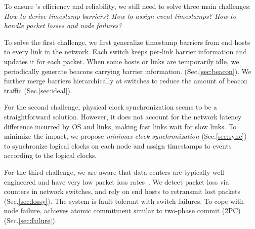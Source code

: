 To ensure \sys's efficiency and reliability, we still need to solve three main challenges: \textit{How to derive timestamp barriers? How to assign event timestamps? How to handle packet losses and node failures?}

To solve the first challenge, we first generalize timestamp barriers from end hosts to every link in the network. Each switch keeps per-link barrier information and updates it for each packet. When some hosts or links are temporarily idle, we periodically generate beacons carrying barrier information. (Sec.\ref{sec:beacon}). We further merge barriers hierarchically at switches to reduce the amount of beacon traffic (Sec.\ref{sec:ideal}).

For the second challenge, physical clock synchronization seems to be a straightforward solution. However, it does not account for the network latency difference incurred by OS and links, making fast links wait for slow links.
To minimize the impact, we propose \textit{minimax clock synchronization} (Sec.\ref{sec:sync}) to synchronize logical clocks on each node and assign timestamps to events according to the logical clocks.

For the third challenge, we are aware that data centers are typically well engineered and have very low packet loss rates~\cite{ports2015designing}. We detect packet loss via counters in network switches, and rely on end hosts to retransmit lost packets (Sec.\ref{sec:lossy}). The system is fault tolerant with switch failures. To cope with node failure, \sys achieves atomic commitment similar to two-phase commit (2PC) (Sec.\ref{sec:failure}).





